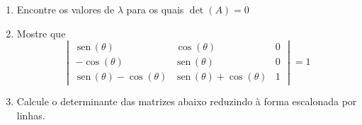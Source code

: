 \documentclass[a4paper,5pt]{amsbook}
\newcommand{\sen}{\,\mbox{sen}\,}
\begin{document}
\begin{enumerate}
%

	\vspace{0.5cm}
	\item Encontre os valores de $\lambda$ para os quais $\det(A)=0$


	\vspace{0.5cm}
	\item Mostre que
		\[\begin{vmatrix}
			\sen(\theta) & \cos(\theta) & 0 \\
			-\cos(\theta) & \sen(\theta) & 0 \\
			\sen(\theta)-\cos(\theta) & \sen(\theta)+\cos(\theta) & 1
		\end{vmatrix}=1\]

	\vspace{0.5cm}
	\item Calcule o determinante das matrizes abaixo reduzindo \`a forma
		escalonada por linhas.


\end{enumerate}
\end{document}

